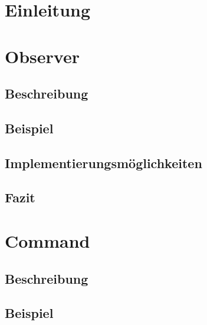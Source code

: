 \documentclass[a4paper,11pt]{scrartcl}
\begin{document}


\tableofcontents %
\pagebreak

\section{Einleitung}


\section{Observer}

\subsection{Beschreibung}

\subsection{Beispiel}

\subsection{Implementierungsmöglichkeiten}

\subsection{Fazit}


\section{Command}

\subsection{Beschreibung}

\subsection{Beispiel}

\end{document}
